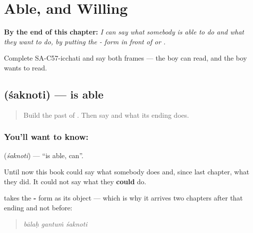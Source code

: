 
\chapter{Able, and Willing}
\label{ch:sa-able-and-willing}

\begin{chapteropening}
\textbf{By the end of this chapter:} \emph{I can say what somebody is able to do and what they want to do, by putting the - form in front of  or .}

Complete SA-C57-icchati and say both frames — the boy can read, and the boy wants to read.
\end{chapteropening}

\section[\texorpdfstring{\sk{शक्नोति} (śaknoti)}{शक्नोति (śaknoti)}]{ (śaknoti) — is able}

\label{lesson:SA-C57-shaknoti}



\begin{quote}
Build the past of \textbf{}. Then say \textbf{} and what its ending does.
\end{quote}

\subsection*{You'll want to know: }
\textbf{} (\emph{śaknoti}) — \textquotedblleft{}is able, can\textquotedblright{}.

Until now this book could say what somebody does and, since last chapter, what they did. It could not say what they \textbf{could} do.

\textbf{} takes the \textbf{-} form as its object — which is why it arrives two chapters after that ending and not before:

\begin{quote}
\textbf{  }
\end{quote}

\begin{quote}
\emph{bālaḥ gantuṁ śaknoti}
\end{quote}

